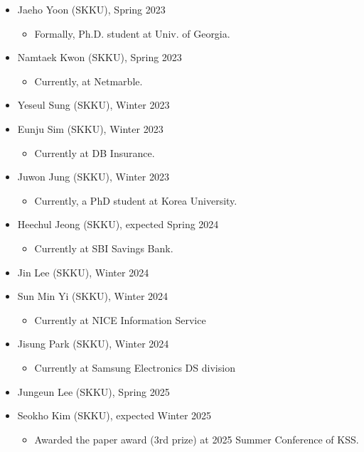 \documentclass[10pt]{article}
\newenvironment{innerlist}[1][\enskip\textbullet]%
        {\begin{itemize}[#1,leftmargin=*,parsep=0pt,itemsep=0pt,topsep=0pt,partopsep=0pt]}
        {\end{itemize}}
\begin{document}
\begin{innerlist}
\begin{innerlist}
\item[] Currently at Neople
\end{innerlist}
\item[] Jaeho Yoon (SKKU), Spring 2023
\begin{innerlist}
\item[] Formally, Ph.D. student at Univ. of Georgia.
\end{innerlist}
\item[] Namtaek Kwon (SKKU), Spring 2023
\begin{innerlist}
\item[] Currently, at Netmarble.
\end{innerlist}
\item[] Yeseul Sung (SKKU), Winter 2023
\item[] Eunju Sim (SKKU), Winter 2023
\begin{innerlist}
\item[] Currently at DB Insurance.
\end{innerlist}
\item[] Juwon Jung (SKKU), Winter 2023
\begin{innerlist}
\item[] Currently, a PhD student at Korea University.
\end{innerlist}
\item[] Heechul Jeong (SKKU), expected Spring 2024
\begin{innerlist}
\item[] Currently at SBI Savings Bank.
\end{innerlist}
\item[] Jin Lee (SKKU), Winter 2024
\item[] Sun Min Yi (SKKU), Winter 2024
\begin{innerlist}
\item[] Currently at NICE Information Service
\end{innerlist}
\item[] Jisung Park (SKKU), Winter 2024
\begin{innerlist}
\item[] Currently at Samsung Electronics DS division
\end{innerlist}
\item[] Jungeun Lee (SKKU), Spring 2025
\item[] Seokho Kim (SKKU), expected Winter 2025
\begin{innerlist}
\item[] Awarded the paper award (3rd prize) at 2025 Summer Conference of KSS.
\end{innerlist}

\end{innerlist}
\end{document}
